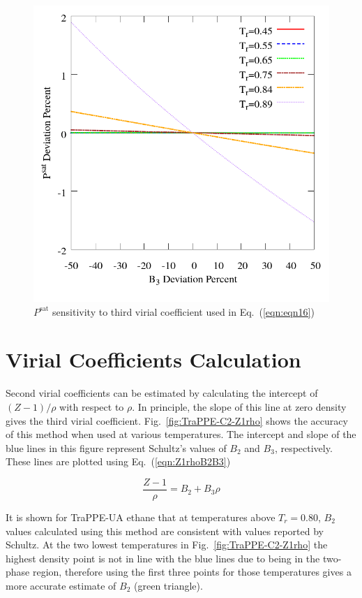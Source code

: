 \documentclass[5p,times]{elsarticle}
\begin{document}
\begin{figure}
\includegraphics[scale=0.3]{Figures/FTT-B3xX-C12-Psat.png}
\caption{$P^{\mathrm{sat}}$ sensitivity to third virial coefficient used in Eq.~(\ref{eqn:eqn16})}
\label{fig:FTT-B3xX-C12-Psat}
\end{figure}


\section{Virial Coefficients Calculation} \label{sec:VirialCalc}
Second virial coefficients can be estimated by calculating the intercept of $(Z-1)/\rho$ with respect to $\rho$. In principle, the slope of this line at zero density gives the third virial coefficient. Fig.~\ref{fig:TraPPE-C2-Z1rho} shows the accuracy of this method when used at various temperatures. The intercept and slope of the blue lines in this figure represent Schultz's \cite{Schultz2010a} values of $B_2$ and $B_3$, respectively. These lines are plotted using Eq.~(\ref{eqn:Z1rhoB2B3})

\begin{equation}
\frac{Z-1}{\rho} = B_2 + B_3\rho \label{eqn:Z1rhoB2B3}
\end{equation}

It is shown for TraPPE-UA ethane that at temperatures above $T_r=0.80$, $B_2$ values calculated using this method are consistent with values reported by Schultz. At the two lowest temperatures in Fig.~\ref{fig:TraPPE-C2-Z1rho} the highest density point is not in line with the blue lines due to being in the two-phase region, therefore using the first three points for those temperatures gives a more accurate estimate of $B_2$ (green triangle).  
\end{document}

